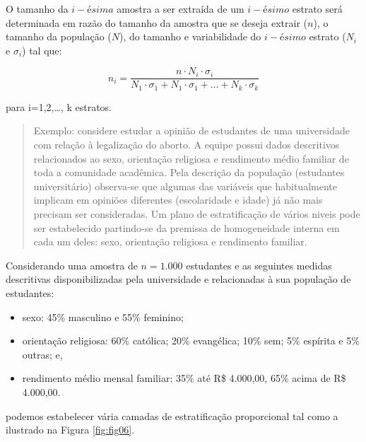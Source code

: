 \documentclass[
]{book}
\providecommand{\tightlist}{%
  \setlength{\itemsep}{0pt}\setlength{\parskip}{0pt}}
\begin{document}
\hfill\break

O tamanho da \(i-ésima\) amostra a ser extraída de um \(i-ésimo\) estrato será determinada em razão do tamanho da amostra que se deseja extrair (\(n\)), o tamanho da população (\(N\)), do tamanho e variabilidade do \(i-ésimo\) estrato (\(N_{i}\) e \(\sigma_{i}\)) tal que:

\hfill\break

\[
n_{i} =\frac{ n \cdot N_{i} \cdot \sigma_{i} }{ N_{1} \cdot \sigma_{1} + N_{1} \cdot \sigma_{1} + \dots+ N_{k} \cdot \sigma_{k}}
\]

para i=1,2,\ldots, k estratos.

\hfill\break

\begin{quote}
Exemplo: considere estudar a opinião de estudantes de uma universidade com relação à legalização do aborto. A equipe possui dados descritivos relacionados ao sexo, orientação religiosa e rendimento médio familiar de toda a comunidade acadêmica.
Pela descrição da população (estudantes universitário) observa-se que algumas das variáveis que habitualmente implicam em opiniões diferentes (escolaridade e idade) já não mais precisam ser consideradas.
Um plano de estratificação de vários niveis pode ser estabelecido partindo-se da premissa de homogeneidade interna em cada um deles: sexo, orientação religiosa e rendimento familiar.
\end{quote}

\hfill\break

Considerando uma amostra de \(n=1.000\) estudantes e as seguintes medidas descritivas disponibilizadas pela universidade e relacionadas à sua população de estudantes:

\hfill\break

\begin{itemize}
\tightlist
\item
  sexo: 45\% masculino e 55\% feminino;\\
\item
  orientação religiosa: 60\% católica; 20\% evangélica; 10\% sem; 5\% espírita e 5\% outras; e,\\
\item
  rendimento médio mensal familiar: 35\% até R\$ 4.000,00, 65\% acima de R\$ 4.000,00.
\end{itemize}

\hfill\break

podemos estabelecer vária camadas de estratificação proporcional tal como a ilustrado na Figura \ref{fig:fig06}.
\end{document}

